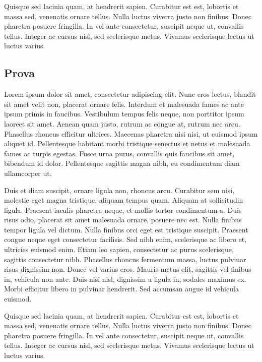 \documentclass[11pt,a4paper]{article}
\begin{document}
Quisque sed lacinia quam, at hendrerit sapien. Curabitur est est, lobortis et massa sed, venenatis ornare tellus. Nulla luctus viverra justo non finibus. Donec pharetra posuere fringilla. In vel ante consectetur, suscipit neque ut, convallis tellus. Integer ac cursus nisl, sed scelerisque metus. Vivamus scelerisque lectus ut luctus varius.
\subsection{Prova}
Lorem ipsum dolor sit amet, consectetur adipiscing elit. Nunc eros lectus, blandit sit amet velit non, placerat ornare felis. Interdum et malesuada fames ac ante ipsum primis in faucibus. Vestibulum tempus felis neque, non porttitor ipsum laoreet sit amet. Aenean quam justo, rutrum ac congue at, rutrum nec arcu. Phasellus rhoncus efficitur ultrices. Maecenas pharetra nisi nisi, ut euismod ipsum aliquet id. Pellentesque habitant morbi tristique senectus et netus et malesuada fames ac turpis egestas. Fusce urna purus, convallis quis faucibus sit amet, bibendum id dolor. Pellentesque sagittis magna nibh, eu condimentum diam ullamcorper ut.

Duis et diam suscipit, ornare ligula non, rhoncus arcu. Curabitur sem nisi, molestie eget magna tristique, aliquam tempus quam. Aliquam at sollicitudin ligula. Praesent iaculis pharetra neque, et mollis tortor condimentum a. Duis risus odio, placerat sit amet malesuada ornare, posuere nec est. Nulla finibus tempor ligula vel dictum. Nulla finibus orci eget est tristique suscipit. Praesent congue neque eget consectetur facilisis. Sed nibh enim, scelerisque ac libero et, ultricies euismod enim. Etiam leo sapien, consectetur ac purus scelerisque, sagittis consectetur nibh. Phasellus rhoncus fermentum massa, luctus pulvinar risus dignissim non. Donec vel varius eros. Mauris metus elit, sagittis vel finibus in, vehicula non ante. Duis nisi nisl, dignissim a ligula in, sodales maximus ex. Morbi efficitur libero in pulvinar hendrerit. Sed accumsan augue id vehicula euismod.

Quisque sed lacinia quam, at hendrerit sapien. Curabitur est est, lobortis et massa sed, venenatis ornare tellus. Nulla luctus viverra justo non finibus. Donec pharetra posuere fringilla. In vel ante consectetur, suscipit neque ut, convallis tellus. Integer ac cursus nisl, sed scelerisque metus. Vivamus scelerisque lectus ut luctus varius.
\end{document}
